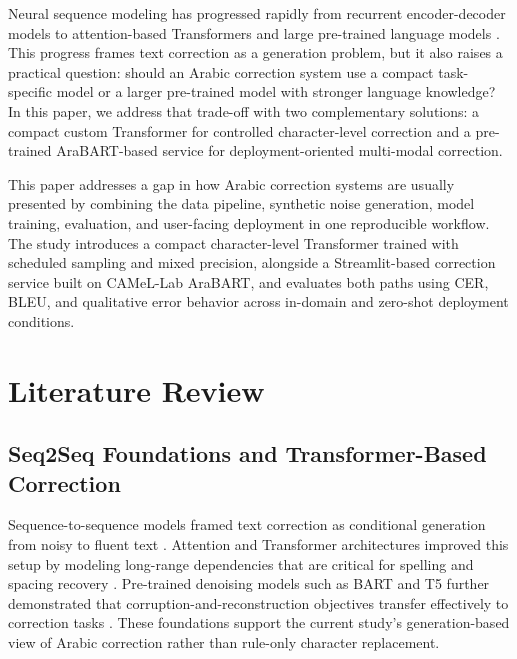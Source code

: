 \documentclass[conference]{IEEEtran}
\begin{document}
Neural sequence modeling has progressed rapidly from recurrent encoder-decoder models to attention-based Transformers and large pre-trained language models \cite{sutskever2014,bahdanau2015,vaswani2017,devlin2019}. This progress frames text correction as a generation problem, but it also raises a practical question: should an Arabic correction system use a compact task-specific model or a larger pre-trained model with stronger language knowledge? In this paper, we address that trade-off with two complementary solutions: a compact custom Transformer for controlled character-level correction and a pre-trained AraBART-based service for deployment-oriented multi-modal correction.

This paper addresses a gap in how Arabic correction systems are usually presented by combining the data pipeline, synthetic noise generation, model training, evaluation, and user-facing deployment in one reproducible workflow. The study introduces a compact character-level Transformer trained with scheduled sampling and mixed precision, alongside a Streamlit-based correction service built on CAMeL-Lab AraBART, and evaluates both paths using CER, BLEU, and qualitative error behavior across in-domain and zero-shot deployment conditions.

\section{Literature Review}
\subsection{Seq2Seq Foundations and Transformer-Based Correction}
Sequence-to-sequence models framed text correction as conditional generation from noisy to fluent text \cite{sutskever2014,bahdanau2015}. Attention and Transformer architectures improved this setup by modeling long-range dependencies that are critical for spelling and spacing recovery \cite{vaswani2017}. Pre-trained denoising models such as BART and T5 further demonstrated that corruption-and-reconstruction objectives transfer effectively to correction tasks \cite{lewis2020bart,raffel2020t5}. These foundations support the current study's generation-based view of Arabic correction rather than rule-only character replacement.
\end{document}
